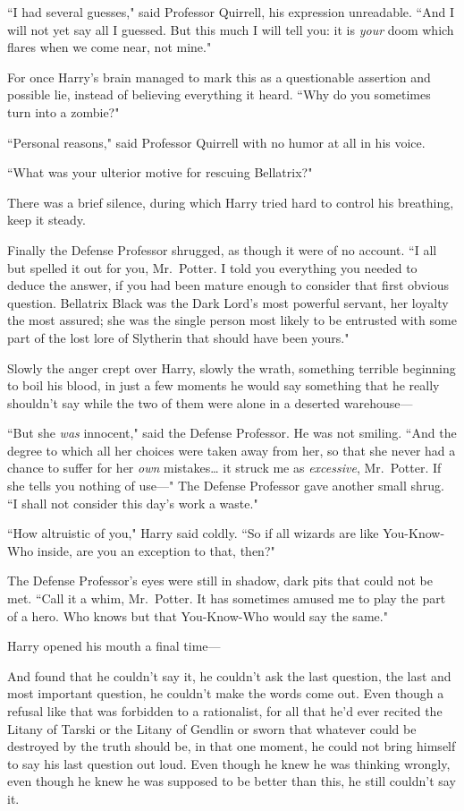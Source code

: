 ``I had several guesses," said Professor Quirrell, his expression unreadable. ``And I will not yet say all I guessed. But this much I will tell you: it is \emph{your} doom which flares when we come near, not mine."

For once Harry's brain managed to mark this as a questionable assertion and possible lie, instead of believing everything it heard. ``Why do you sometimes turn into a zombie?"

``Personal reasons," said Professor Quirrell with no humor at all in his voice.

``What was your ulterior motive for rescuing Bellatrix?"

There was a brief silence, during which Harry tried hard to control his breathing, keep it steady.

Finally the Defense Professor shrugged, as though it were of no account. ``I all but spelled it out for you, Mr.~Potter. I told you everything you needed to deduce the answer, if you had been mature enough to consider that first obvious question. Bellatrix Black was the Dark Lord's most powerful servant, her loyalty the most assured; she was the single person most likely to be entrusted with some part of the lost lore of Slytherin that should have been yours."

Slowly the anger crept over Harry, slowly the wrath, something terrible beginning to boil his blood, in just a few moments he would say something that he really shouldn't say while the two of them were alone in a deserted warehouse—

``But she \emph{was} innocent," said the Defense Professor. He was not smiling. ``And the degree to which all her choices were taken away from her, so that she never had a chance to suffer for her \emph{own} mistakes{\ldots} it struck me as \emph{excessive}, Mr.~Potter. If she tells you nothing of use—" The Defense Professor gave another small shrug. ``I shall not consider this day's work a waste."

``How altruistic of you," Harry said coldly. ``So if all wizards are like You-Know-Who inside, are you an exception to that, then?"

The Defense Professor's eyes were still in shadow, dark pits that could not be met. ``Call it a whim, Mr.~Potter. It has sometimes amused me to play the part of a hero. Who knows but that You-Know-Who would say the same."

Harry opened his mouth a final time—

And found that he couldn't say it, he couldn't ask the last question, the last and most important question, he couldn't make the words come out. Even though a refusal like that was forbidden to a rationalist, for all that he'd ever recited the Litany of Tarski or the Litany of Gendlin or sworn that whatever could be destroyed by the truth should be, in that one moment, he could not bring himself to say his last question out loud. Even though he knew he was thinking wrongly, even though he knew he was supposed to be better than this, he still couldn't say it.

